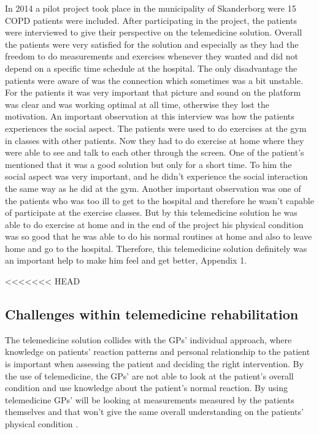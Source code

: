 In 2014 a pilot project took place in the municipality of Skanderborg were 15 COPD patients were included. After participating in the project, the patients were interviewed to give their perspective on the telemedicine solution. Overall the patients were very satisfied for the solution and especially as they had the freedom to do measurements and exercises whenever they wanted and did not depend on a specific time schedule at the hospital. The only disadvantage the patients were aware of was the connection which sometimes was a bit unstable. For the patients it was very important that picture and sound on the platform was clear and was working optimal at all time, otherwise they lost the motivation. An important observation at this interview was how the patients experiences the social aspect. The patients were used to do exercises at the gym in classes with other patients. Now they had to do exercise at home where they were able to see and talk to each other through the screen. One of the patient’s mentioned that it was a good solution but only for a short time. To him the social aspect was very important, and he didn’t experience the social interaction the same way as he did at the gym. Another important observation was one of the patients who was too ill to get to the hospital and therefore he wasn’t capable of participate at the exercise classes. But by this telemedicine solution he was able to do exercise at home and in the end of the project his physical condition was so good that he was able to do his normal routines at home and also to leave home and go to the hospital. Therefore, this telemedicine solution definitely was an important help to make him feel and get better, Appendix 1. 

<<<<<<< HEAD
\subsection{Challenges within telemedicine rehabilitation} 
The telemedicine solution collides with the GPs’ individual approach, where knowledge on patients’ reaction patterns and personal relationship to the patient is important when assessing the patient and deciding the right intervention. By the use of telemedicine, the GPs’ are not able to look at the patient’s overall condition and use knowledge about the patient’s normal reaction. By using telemedicine GPs’ will be looking at measurements measured by the patients themselves and that won’t give the same overall understanding on the patients’ physical condition \cite{Emergence}.  

